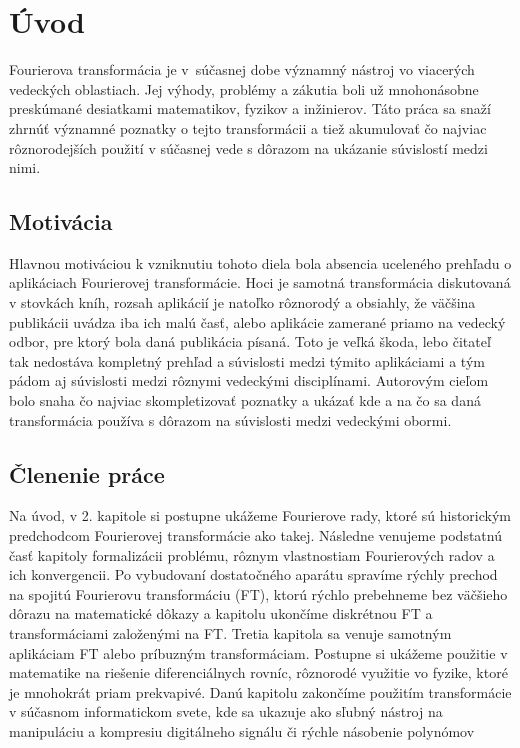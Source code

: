 \chapter{Úvod}

Fourierova transformácia je v~súčasnej dobe významný nástroj vo
viacerých vedeckých oblastiach. Jej výhody, problémy a zákutia boli už
mnohonásobne preskúmané desiatkami matematikov, fyzikov a inžinierov.
Táto práca sa snaží zhrnúť významné poznatky o tejto transformácii a
tiež akumulovať čo najviac rôznorodejších použití v súčasnej vede
s dôrazom na ukázanie súvislostí medzi nimi.

\section{Motivácia}
Hlavnou motiváciou k vzniknutiu tohoto diela bola absencia uceleného
prehľadu o aplikáciach Fourierovej transformácie. Hoci je samotná
transformácia diskutovaná v stovkách kníh, rozsah aplikácií je natoľko
rôznorodý a obsiahly, že väčšina publikácii uvádza iba ich malú časť,
alebo aplikácie zamerané priamo na vedecký odbor, pre ktorý bola daná
publikácia písaná. Toto je veľká škoda, lebo čitateľ tak nedostáva
kompletný prehľad a súvislosti medzi týmito aplikáciami a tým
pádom aj súvislosti medzi rôznymi vedeckými disciplínami. Autorovým
cieľom bolo snaha čo najviac skompletizovať poznatky a ukázať kde a
na čo sa daná transformácia používa s dôrazom na súvislosti medzi
vedeckými obormi.

\section{Členenie práce}
Na úvod, v 2. kapitole si postupne ukážeme Fourierove rady, ktoré sú
historickým predchodcom Fourierovej transformácie ako takej. Následne
venujeme podstatnú časť kapitoly formalizácii problému, rôznym
vlastnostiam Fourierových radov a ich konvergencii. Po vybudovaní
dostatočného aparátu spravíme rýchly prechod na spojitú Fourierovu
transformáciu (FT), ktorú rýchlo prebehneme bez väčšieho dôrazu na
matematické dôkazy a kapitolu ukončíme diskrétnou FT a 
transformáciami založenými na FT.
Tretia kapitola sa venuje samotným aplikáciam FT alebo príbuzným
transformáciam. Postupne si ukážeme použitie v matematike na riešenie
diferenciálnych rovníc, rôznorodé využitie vo fyzike, ktoré je
mnohokrát priam prekvapivé. Danú kapitolu zakončíme použitím
transformácie v súčasnom informatickom svete, kde sa ukazuje ako
sľubný nástroj na manipuláciu a kompresiu digitálneho signálu či
rýchle násobenie polynómov
